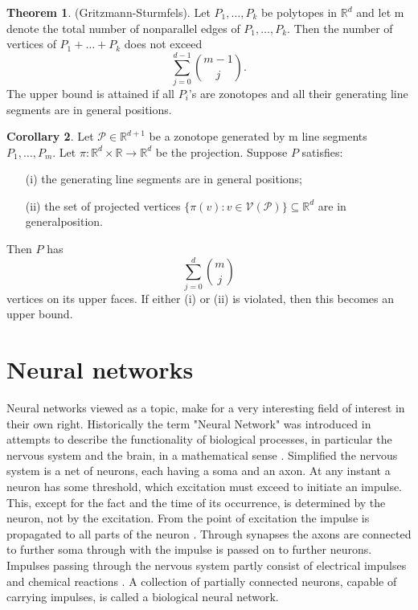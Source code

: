 \documentclass{article}
\theoremstyle{definition}
\newtheorem{theorem}{Theorem}[section]
\newtheorem{corollary}[theorem]{Corollary}
\begin{document}
\begin{theorem}
(Gritzmann-Sturmfels). Let $P_1, \dots , P_k$ be polytopes in $\mathbb{R}^{d}$ and let m denote the total number of nonparallel edges of $P_1, \dots , P_k$. Then the number of vertices of $P_1 + \dots + P_k$ does not exceed
$$\sum_{j=0}^{d-1} \binom{m-1}{j}.$$
The upper bound is attained if all $P_i$'s are zonotopes and all their generating line segments are in general positions. \cite{gritzmann1993minkowski}
\end{theorem}

\begin{corollary}
Let $\mathcal{P} \in \mathbb{R}^{d+1}$ be a zonotope generated by m line segments $P_1 , \dots , P_m$. Let $\pi : \mathbb{R}^{d} \times \mathbb{R} \to \mathbb{R}^{d}$ be the projection. Suppose $P$ satisfies:
\begin{itemize}
\item[(i)]
the generating line segments are in general positions;
\item[(ii)]
the set of projected vertices $\{ \pi(v) : v \in \mathcal{V}(\mathcal{P}) \} \subseteq \mathbb{R}^{d}$ are in generalposition.
\end{itemize}
Then $P$ has
$$ \sum_{j=0}^{d} \binom{m}{j} $$
vertices on its upper faces. If either (i) or (ii) is violated, then this becomes an upper bound. \cite[p.~4]{zhang2018tropical}
\end{corollary}

\newpage

\section{Neural networks}

Neural networks viewed as a topic, make for a very interesting field of interest in their own right. Historically the term "Neural Network" was introduced in attempts to describe the functionality of biological processes, in particular the nervous system and the brain, in a mathematical sense \cite{mcculloch1943logical, widrow1960adaptive, rumelhart1986learning}. Simplified the nervous system is a net of neurons, each having a soma and an axon. At any instant a neuron has some threshold, which excitation must exceed to initiate an impulse. This, except for the fact and the time of its occurrence, is determined by the neuron, not by the excitation. From the point of excitation the impulse is propagated to all parts of the neuron \cite{mcculloch1943logical}. Through synapses the axons are connected to further soma through with the impulse is passed on to further neurons. Impulses passing through the nervous system partly consist of electrical impulses and chemical reactions \cite{palay1956synapses}. A collection of partially connected neurons, capable of carrying impulses, is called a biological neural network.
\end{document}
